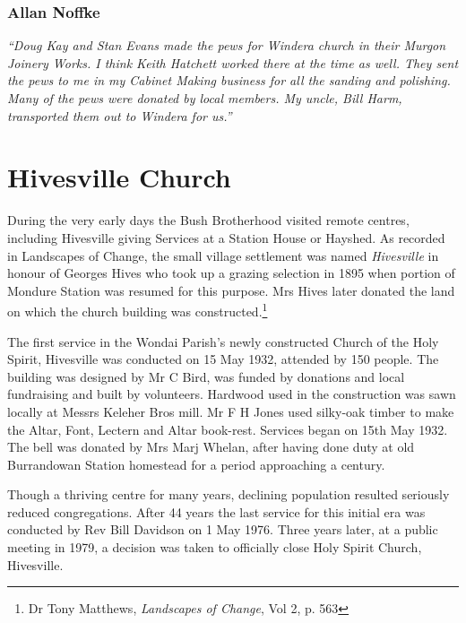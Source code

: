 \subsubsection{Allan Noffke}



\emph{``Doug Kay and Stan Evans made the pews for Windera church in their Murgon Joinery Works. I think Keith Hatchett worked there at the time as well. They sent the pews to me in my Cabinet Making business for all the sanding and polishing. Many of the pews were donated by local members. My uncle, Bill Harm, transported them out to Windera for us.''}



\section{Hivesville Church}



During the very early days the Bush Brotherhood visited remote centres, including Hivesville giving Services at a Station House or Hayshed. As recorded in Landscapes of Change, the small village settlement was named \emph{Hivesville} in honour of Georges Hives who took up a grazing selection in 1895 when portion of Mondure Station was resumed for this purpose. Mrs Hives later donated the land on which the church building was constructed.\footnote{Dr Tony Matthews, \emph{Landscapes of Change}, Vol 2, p. 563}


The first service in the Wondai Parish's newly constructed Church of the Holy Spirit, Hivesville was conducted on 15 May 1932, attended by 150 people. The building was designed by Mr C Bird, was funded by donations and local fundraising and built by volunteers. Hardwood used in the construction was sawn locally at Messrs Keleher Bros mill. Mr F H Jones used silky-oak timber to make the Altar, Font, Lectern and Altar book-rest. Services began on 15th May 1932. The bell was donated by Mrs Marj Whelan, after having done duty at old Burrandowan Station homestead for a period approaching a century.



Though a thriving centre for many years, declining population resulted seriously reduced congregations. After 44 years the last service for this initial era was conducted by Rev Bill Davidson on 1 May 1976. Three years later, at a public meeting in 1979, a decision was taken to officially close Holy Spirit Church, Hivesville.



